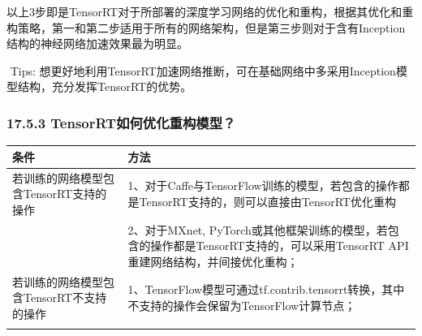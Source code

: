 ​
以上3步即是TensorRT对于所部署的深度学习网络的优化和重构，根据其优化和重构策略，第一和第二步适用于所有的网络架构，但是第三步则对于含有Inception结构的神经网络加速效果最为明显。

​ Tips:
想更好地利用TensorRT加速网络推断，可在基础网络中多采用Inception模型结构，充分发挥TensorRT的优势。

\subsubsection{17.5.3
TensorRT如何优化重构模型？}\label{tensorrtux5982ux4f55ux4f18ux5316ux91cdux6784ux6a21ux578b}

\begin{longtable}[]{ ll }
\toprule
\begin{minipage}[b]{0.38\columnwidth}\raggedright\strut
条件\strut
\end{minipage} & \begin{minipage}[b]{0.56\columnwidth}\raggedright\strut
方法\strut
\end{minipage}\tabularnewline
\midrule
\endhead
\begin{minipage}[t]{0.38\columnwidth}\raggedright\strut
若训练的网络模型包含TensorRT支持的操作\strut
\end{minipage} & \begin{minipage}[t]{0.56\columnwidth}\raggedright\strut
1、对于Caffe与TensorFlow训练的模型，若包含的操作都是TensorRT支持的，则可以直接由TensorRT优化重构\strut
\end{minipage}\tabularnewline
\begin{minipage}[t]{0.38\columnwidth}\raggedright\strut
\strut
\end{minipage} & \begin{minipage}[t]{0.56\columnwidth}\raggedright\strut
2、对于MXnet,
PyTorch或其他框架训练的模型，若包含的操作都是TensorRT支持的，可以采用TensorRT
API重建网络结构，并间接优化重构；\strut
\end{minipage}\tabularnewline
\begin{minipage}[t]{0.38\columnwidth}\raggedright\strut
若训练的网络模型包含TensorRT不支持的操作\strut
\end{minipage} & \begin{minipage}[t]{0.56\columnwidth}\raggedright\strut
1、TensorFlow模型可通过tf.contrib.tensorrt转换，其中不支持的操作会保留为TensorFlow计算节点；\strut
\end{minipage}\tabularnewline
\begin{minipage}[t]{0.38\columnwidth}\raggedright\strut

\end{minipage}
\end{longtable}

